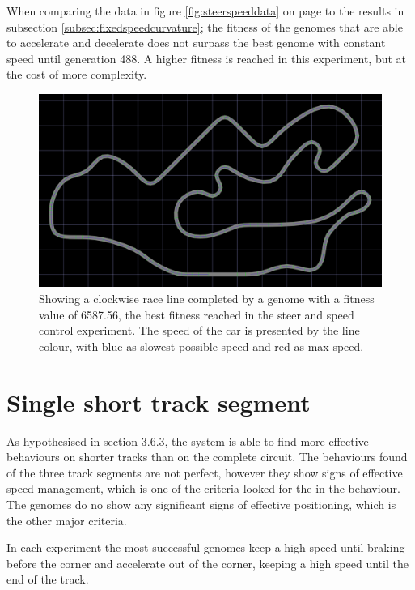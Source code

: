 When comparing the data in figure \ref{fig:steerspeeddata} on page \pageref{fig:steerspeeddata} to the results in subsection \ref{subsec:fixedspeedcurvature}; the fitness of the genomes that are able to accelerate and decelerate does not surpass the best genome with constant speed until generation 488. A higher fitness is reached in this experiment, but at the cost of more complexity.


\begin{figure}[h]
\includegraphics[width=\textwidth]{report/images/normal_generation_6558}
\centering
\caption{Showing a clockwise race line completed by a genome with a fitness value of 6587.56, the best fitness reached in the steer and speed control experiment. The speed of the car is presented by the line colour, with blue as slowest possible speed and red as max speed.}
\label{fig:steerspeedline}
\end{figure}

\section{Single short track segment}

As hypothesised in section $3.6.3$, the system is able to find more effective behaviours on shorter tracks than on the complete circuit. The behaviours found of the three track segments are not perfect, however they show signs of effective speed management, which is one of the criteria looked for the in the behaviour. The genomes do no show any significant signs of effective positioning, which is the other major criteria. 

In each experiment the most successful genomes keep a high speed until braking before the corner and accelerate out of the corner, keeping a high speed until the end of the track. 

